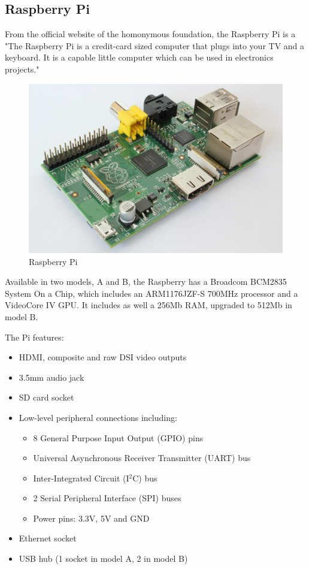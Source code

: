 \subsection{Raspberry Pi}

From the official website of the homonymous foundation, the Raspberry Pi is a "The Raspberry Pi is a credit-card sized computer that plugs into your TV and a keyboard. It is a capable little computer which can be used in electronics projects."\\

	\begin{figure}[H]
			\centering
			\includegraphics[scale=0.07]{images/ProjectComponents/raspberry.jpg}
			\caption{Raspberry Pi}
			\label{}
	\end{figure}
	\bigskip

Available in two models, A and B, the Raspberry has a Broadcom BCM2835 System On a Chip, which includes an ARM1176JZF-S 700MHz processor and a VideoCore IV GPU. It includes as well a 256Mb RAM, upgraded to 512Mb in model B.\\

\bigskip

The Pi features: 
	\begin{itemize}
		  \item HDMI, composite and raw DSI video outputs
		  \item 3.5mm audio jack
		  \item SD card socket
		  \item Low-level peripheral connections including:
		  	\begin{itemize}
		  	\item 8 General Purpose Input Output (GPIO) pins
		  	\item Universal Asynchronous Receiver Transmitter (UART) bus
		  	\item Inter-Integrated Circuit (I$^2$C) bus
		  	\item 2 Serial Peripheral Interface (SPI) buses
		  	\item Power pins: 3.3V, 5V and GND
		  	\end{itemize}
		  \item Ethernet socket
		  \item USB hub (1 socket in model A, 2 in model B)

	\end{itemize}

